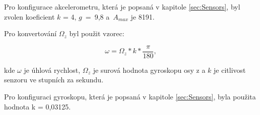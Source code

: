 Pro konfigurace akcelerometru, která je popsaná v kapitole \ref{sec:Sensors}, 
byl zvolen koeficient $k$ = 4, $g$~=~9,8 a~$A_{max}$ je 8191.

Pro konvertování $\Omega_z$ byl použit vzorec:

\begin{equation}
\omega = \Omega_z * k * \frac{\pi}{180},
\end{equation}

kde $\omega$ je úhlová rychlost, $\Omega_z$ je surová hodnota gyroskopu osy z a 
$k$ je citlivost senzoru ve stupních za sekundu. 

Pro konfiguraci gyroskopu, která je popsaná v kapitole \ref{sec:Sensors}, 
byla použita hodnota k = 0,03125.

\endinput